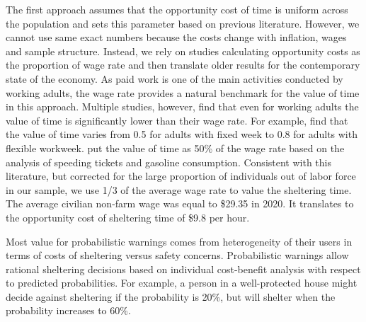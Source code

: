 \documentclass{ametsocV6.1}
\newcommand{\add}[1]{{\color{red}#1}}
\begin{document}
\add{The first approach assumes that the opportunity cost of time is uniform across the population and sets this parameter based on previous literature. However, we cannot use same exact numbers because the costs change with inflation, wages and sample structure. Instead, we rely on studies calculating opportunity costs as the proportion of wage rate and then translate older results for the contemporary state of the economy.} As paid work is one of the main activities conducted by working adults, the wage rate provides a natural benchmark for the value of time in this approach. Multiple studies, however, find that even for working adults the value of time is significantly lower than their wage rate. For example, \citet{larson_revealing_2004} find that the value of time varies from 0.5 for adults with fixed week to 0.8 for adults with flexible workweek. \citet{wolff_value_2014} put the value of time as 50\% of the wage rate based on the analysis of speeding tickets and gasoline consumption. \add{Consistent with this literature, but corrected for the large proportion of individuals out of labor force in our sample}, we use 1/3 of the average wage rate to value the sheltering time. The average civilian non-farm wage was equal to \$29.35 in 2020. It translates to the opportunity cost of sheltering time of \$9.8 per hour.

Most value for probabilistic warnings comes from heterogeneity of their users in terms of costs of sheltering versus safety concerns. Probabilistic warnings allow rational sheltering decisions based on individual cost-benefit analysis with respect to predicted probabilities. For example, a person in a well-protected house might decide against sheltering if the probability is 20\%, but will shelter when the probability increases to 60\%. 
\end{document}
